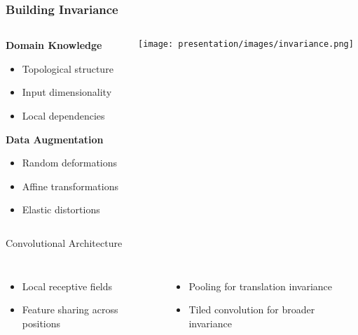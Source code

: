 \documentclass{beamer}
\begin{document}
\begin{frame}
\frametitle{Building Invariance}
\begin{columns}
    \begin{column}{0.48\textwidth}
        \textbf{Domain Knowledge}
        \begin{itemize}
        \item Topological structure
        \item Input dimensionality
        \item Local dependencies
        \end{itemize}

        \textbf{Data Augmentation}
        \begin{itemize}
        \item Random deformations
        \item Affine transformations
        \item Elastic distortions
        \end{itemize}
    \end{column}
    \pause

    \begin{column}{0.5\textwidth}
        \hspace{-1.1cm}
        \texttt{[image: presentation/images/invariance.png]}
    \end{column}
\end{columns}

\begin{block}{Convolutional Architecture}
    \vspace{-0.2cm}
    \begin{columns}
        \begin{itemize}
        \item Local receptive fields
        \item Feature sharing across positions
        \end{itemize}
        
        \begin{itemize}
        \item Pooling for translation invariance
        \item Tiled convolution for broader invariance
        \end{itemize}
    \end{columns}
\end{block}
\end{frame}
\end{document}
